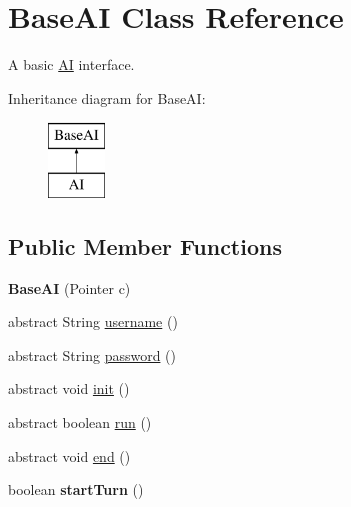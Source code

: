 \hypertarget{classBaseAI}{
\section{BaseAI Class Reference}
\label{classBaseAI}
}


A basic \hyperlink{classAI}{AI} interface.  


Inheritance diagram for BaseAI:\begin{figure}[H]
\begin{center}
\leavevmode
\includegraphics[height=2.000000cm]{classBaseAI}
\end{center}
\end{figure}
\subsection*{Public Member Functions}
\begin{DoxyCompactItemize}
\item 
\hypertarget{classBaseAI_a27e93801ded2a4e1846f2b58beb37972}{
{\bfseries BaseAI} (Pointer c)}
\label{classBaseAI_a27e93801ded2a4e1846f2b58beb37972}

\item 
abstract String \hyperlink{classBaseAI_aa26770dd7db8dd0c4466dd770d4e05ba}{username} ()
\item 
abstract String \hyperlink{classBaseAI_a8607533e2b5bd9920ded593ae6509f48}{password} ()
\item 
abstract void \hyperlink{classBaseAI_a71b49f4ca248bfd32a9f9557cb6d494a}{init} ()
\item 
abstract boolean \hyperlink{classBaseAI_a56c96a58c1f1e93d17f9817711a45594}{run} ()
\item 
abstract void \hyperlink{classBaseAI_afb1c3a00ed081e9efdfff9f7d1e6910d}{end} ()
\item 
\hypertarget{classBaseAI_a862e05b3099817fcceb55beeef7225fe}{
boolean {\bfseries startTurn} ()}
\label{classBaseAI_a862e05b3099817fcceb55beeef7225fe}

\end{DoxyCompactItemize}
